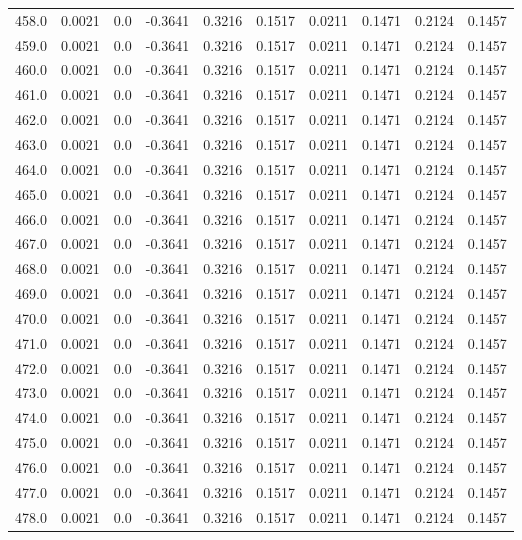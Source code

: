 \begin{longtable}{lrrrrrrrrr}
458.0 & 0.0021 & 0.0 & -0.3641 & 0.3216 & 0.1517 & 0.0211 & 0.1471 & 0.2124 & 0.1457 \\
459.0 & 0.0021 & 0.0 & -0.3641 & 0.3216 & 0.1517 & 0.0211 & 0.1471 & 0.2124 & 0.1457 \\
460.0 & 0.0021 & 0.0 & -0.3641 & 0.3216 & 0.1517 & 0.0211 & 0.1471 & 0.2124 & 0.1457 \\
461.0 & 0.0021 & 0.0 & -0.3641 & 0.3216 & 0.1517 & 0.0211 & 0.1471 & 0.2124 & 0.1457 \\
462.0 & 0.0021 & 0.0 & -0.3641 & 0.3216 & 0.1517 & 0.0211 & 0.1471 & 0.2124 & 0.1457 \\
463.0 & 0.0021 & 0.0 & -0.3641 & 0.3216 & 0.1517 & 0.0211 & 0.1471 & 0.2124 & 0.1457 \\
464.0 & 0.0021 & 0.0 & -0.3641 & 0.3216 & 0.1517 & 0.0211 & 0.1471 & 0.2124 & 0.1457 \\
465.0 & 0.0021 & 0.0 & -0.3641 & 0.3216 & 0.1517 & 0.0211 & 0.1471 & 0.2124 & 0.1457 \\
466.0 & 0.0021 & 0.0 & -0.3641 & 0.3216 & 0.1517 & 0.0211 & 0.1471 & 0.2124 & 0.1457 \\
467.0 & 0.0021 & 0.0 & -0.3641 & 0.3216 & 0.1517 & 0.0211 & 0.1471 & 0.2124 & 0.1457 \\
468.0 & 0.0021 & 0.0 & -0.3641 & 0.3216 & 0.1517 & 0.0211 & 0.1471 & 0.2124 & 0.1457 \\
469.0 & 0.0021 & 0.0 & -0.3641 & 0.3216 & 0.1517 & 0.0211 & 0.1471 & 0.2124 & 0.1457 \\
470.0 & 0.0021 & 0.0 & -0.3641 & 0.3216 & 0.1517 & 0.0211 & 0.1471 & 0.2124 & 0.1457 \\
471.0 & 0.0021 & 0.0 & -0.3641 & 0.3216 & 0.1517 & 0.0211 & 0.1471 & 0.2124 & 0.1457 \\
472.0 & 0.0021 & 0.0 & -0.3641 & 0.3216 & 0.1517 & 0.0211 & 0.1471 & 0.2124 & 0.1457 \\
473.0 & 0.0021 & 0.0 & -0.3641 & 0.3216 & 0.1517 & 0.0211 & 0.1471 & 0.2124 & 0.1457 \\
474.0 & 0.0021 & 0.0 & -0.3641 & 0.3216 & 0.1517 & 0.0211 & 0.1471 & 0.2124 & 0.1457 \\
475.0 & 0.0021 & 0.0 & -0.3641 & 0.3216 & 0.1517 & 0.0211 & 0.1471 & 0.2124 & 0.1457 \\
476.0 & 0.0021 & 0.0 & -0.3641 & 0.3216 & 0.1517 & 0.0211 & 0.1471 & 0.2124 & 0.1457 \\
477.0 & 0.0021 & 0.0 & -0.3641 & 0.3216 & 0.1517 & 0.0211 & 0.1471 & 0.2124 & 0.1457 \\
478.0 & 0.0021 & 0.0 & -0.3641 & 0.3216 & 0.1517 & 0.0211 & 0.1471 & 0.2124 & 0.1457 \\

\end{longtable}
